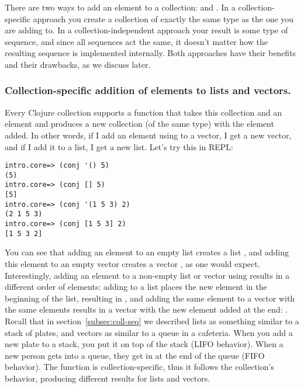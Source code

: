 There are two ways to add an element to a collection:  and . In a collection-specific approach you create a collection of exactly the same type as the one you are adding to. In a collection-independent approach your result is some type of  sequence, and since all sequences act the same, it doesn't matter how the resulting sequence is implemented internally.  Both approaches have their benefits and their drawbacks, as we discuss later. 

\subsubsection{Collection-specific addition of elements to lists and vectors. }\label{subsubsec:conj}
Every Clojure collection supports a function  that takes this collection and an element and produces a new collection (of the same type) with the element added. In other words, if I add an element using   to a vector, I get a new vector, and if I add it to a list, I get a new list. Let's try this in REPL:
\begin{framed}
\begin{verbatim}
intro.core=> (conj '() 5)
(5)
intro.core=> (conj [] 5)
[5]
intro.core=> (conj '(1 5 3) 2)
(2 1 5 3)
intro.core=> (conj [1 5 3] 2)
[1 5 3 2]
\end{verbatim}
\end{framed}
You can see that adding an element  to an empty list creates a list , and adding this element to an empty vector creates a vector \clocode{[5]}, as one would expect. Interestingly, adding an element to a non-empty list or vector using  results in a different order of elements: adding  to a list  places the new element in the beginning of the list, resulting in , and adding the same element  to a vector with the same elements \clocode{[1 5 3]} results in a vector with the new element added at the end: \clocode{[1 5 3 2]}. Recall that in section~\ref{subsec:coll-seq} we described lists as something similar to a stack of plates, and vectors as similar to a queue in a cafeteria. When you add a new plate to a stack, you put it on top of the stack  (LIFO behavior). When a new person gets into a queue, they get in at the end of the queue (FIFO behavior). The function  is collection-specific, thus it follows the collection's behavior, producing different results for lists and vectors. 

